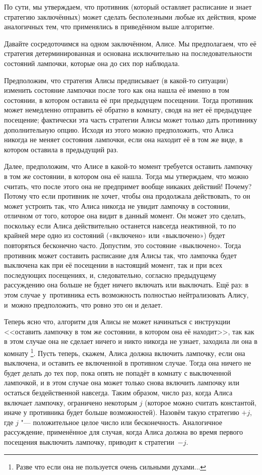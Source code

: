 \documentclass[twoside]{book}
\begin{document}
По сути, мы утверждаем, что противник (который оставляет расписание и
знает стратегию заключённых) может сделать бесполезными любые их
действия, кроме аналогичных тем, что применялись в приведённом выше алгоритме.

Давайте сосредоточимся на одном заключённом, Алисе.
Мы предполагаем, что её стратегия детерминированная и основана исключительно на последовательности состояний лампочки, которые она до сих пор наблюдала.

Предположим, что стратегия Алисы предписывает (в какой-то ситуации) 
изменить состояние лампочки после того как она нашла
её именно в том состоянии, в котором оставила её при предыдущем посещении.
Тогда противник может немедленно отправить её обратно в комнату, сводя
на нет её предыдущее посещение;
фактически эта часть стратегии Алисы может только дать противнику дополнительную опцию.
Исходя из этого можно предположить, что Алиса никогда не меняет
состояния лампочки, если она находит её в том же виде, в котором
оставила в предыдущий раз.

Далее, предположим, что Алисе в какой-то момент требуется оставить лампочку в том же состоянии, в котором она её нашла.
Тогда мы утверждаем, что можно считать, что после этого она не
предпримет вообще никаких действий!
Почему?
Потому что если противник не хочет, чтобы она продолжала действовать, то он может устроить так, что Алиса никогда не увидит лампочку в состоянии, отличном от того, которое она видит в данный момент.
Он может это сделать, поскольку если Алиса действительно останется навсегда неактивной, то по крайней мере одно из состояний («включено» или «выключено») будет повторяться бесконечно часто.
Допустим, это состояние «выключено».
Тогда противник может составить расписание для Алисы так, что лампочка
будет выключена как при её посещении в настоящий момент, так и при
всех последующих посещениях, и, следовательно, согласно предыдущему
рассуждению она больше не будет ничего включать или выключать.
Ещё раз: в этом случае у~противника есть возможность полностью нейтрализовать Алису, и~можно предположить, что ровно это он и делает.

Теперь ясно что, алгоритм для Алисы не может начинаться с инструкции
<<оставить лампочку в том же состоянии, в котором она её находит>>,
так как в этом случае она не сделает ничего и никто никогда не узнает,
заходила ли она в комнату%
\footnote{Разве что если она не пользуется очень сильными духами...}.
Пусть теперь, скажем, Алиса должна включить лампочку, если она
выключена, и оставить ее включенной в противном случае.
Тогда она ничего не будет делать до тех пор, пока опять не попадёт в комнату с выключенной лампочкой, и в этом случае она может только снова включить лампочку или остаться бездейственной навсегда.
Таким образом, число раз, когда Алиса включает лампочку, ограничено некоторым $j$ (которое можно считать константой, иначе у противника будет больше возможностей).
Назовём такую стратегию $+j$, где $j$ "--- положительное целое число или бесконечность.
Аналогичное рассуждение, применённое для случая, когда Алиса должна во время первого посещения выключить лампочку, приводит к стратегии~$-j$.
\end{document}

